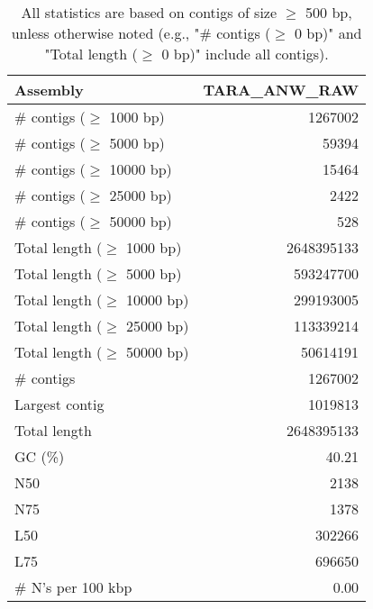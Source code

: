 \documentclass[12pt,a4paper]{article}
\begin{document}
\begin{table}[ht]
\begin{center}
\caption{All statistics are based on contigs of size $\geq$ 500 bp, unless otherwise noted (e.g., "\# contigs ($\geq$ 0 bp)" and "Total length ($\geq$ 0 bp)" include all contigs).}
\begin{tabular}{|l*{1}{|r}|}
\hline
Assembly & TARA\_ANW\_RAW \\ \hline
\# contigs ($\geq$ 1000 bp) & 1267002 \\ \hline
\# contigs ($\geq$ 5000 bp) & 59394 \\ \hline
\# contigs ($\geq$ 10000 bp) & 15464 \\ \hline
\# contigs ($\geq$ 25000 bp) & 2422 \\ \hline
\# contigs ($\geq$ 50000 bp) & 528 \\ \hline
Total length ($\geq$ 1000 bp) & 2648395133 \\ \hline
Total length ($\geq$ 5000 bp) & 593247700 \\ \hline
Total length ($\geq$ 10000 bp) & 299193005 \\ \hline
Total length ($\geq$ 25000 bp) & 113339214 \\ \hline
Total length ($\geq$ 50000 bp) & 50614191 \\ \hline
\# contigs & 1267002 \\ \hline
Largest contig & 1019813 \\ \hline
Total length & 2648395133 \\ \hline
GC (\%) & 40.21 \\ \hline
N50 & 2138 \\ \hline
N75 & 1378 \\ \hline
L50 & 302266 \\ \hline
L75 & 696650 \\ \hline
\# N's per 100 kbp & 0.00 \\ \hline
\end{tabular}
\end{center}
\end{table}
\end{document}
